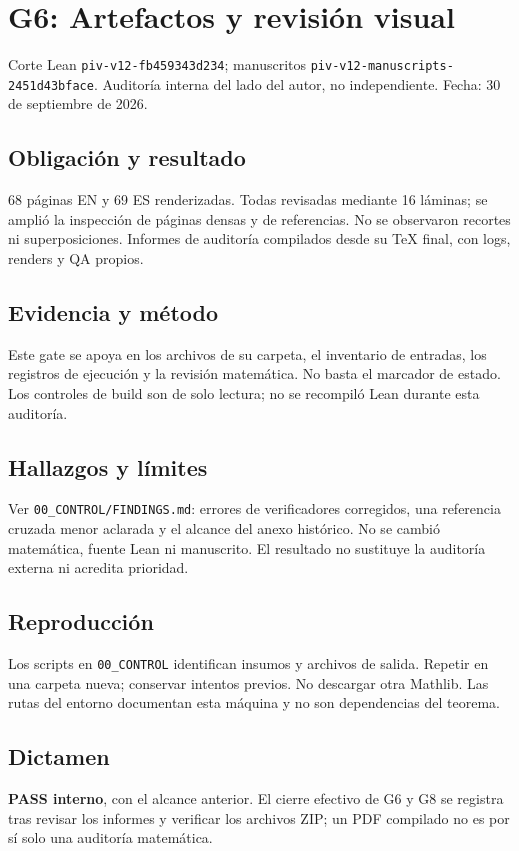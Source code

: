 \section{G6: Artefactos y revisión
visual}\label{g6-artefactos-y-revisiuxf3n-visual}

Corte Lean \texttt{piv-v12-fb459343d234}; manuscritos
\texttt{piv-v12-manuscripts-2451d43bface}. Auditoría interna del lado
del autor, no independiente. Fecha: 30 de septiembre de 2026.

\subsection{Obligación y resultado}\label{obligaciuxf3n-y-resultado}

68 páginas EN y 69 ES renderizadas. Todas revisadas mediante 16 láminas;
se amplió la inspección de páginas densas y de referencias. No se
observaron recortes ni superposiciones. Informes de auditoría compilados
desde su TeX final, con logs, renders y QA propios.

\subsection{Evidencia y método}\label{evidencia-y-muxe9todo}

Este gate se apoya en los archivos de su carpeta, el inventario de
entradas, los registros de ejecución y la revisión matemática. No basta
el marcador de estado. Los controles de build son de solo lectura; no se
recompiló Lean durante esta auditoría.

\subsection{Hallazgos y límites}\label{hallazgos-y-luxedmites}

Ver \texttt{00\_CONTROL/FINDINGS.md}: errores de verificadores
corregidos, una referencia cruzada menor aclarada y el alcance del anexo
histórico. No se cambió matemática, fuente Lean ni manuscrito. El
resultado no sustituye la auditoría externa ni acredita prioridad.

\subsection{Reproducción}\label{reproducciuxf3n}

Los scripts en \texttt{00\_CONTROL} identifican insumos y archivos de
salida. Repetir en una carpeta nueva; conservar intentos previos. No
descargar otra Mathlib. Las rutas del entorno documentan esta máquina y
no son dependencias del teorema.

\subsection{Dictamen}\label{dictamen}

\textbf{PASS interno}, con el alcance anterior. El cierre efectivo de G6
y G8 se registra tras revisar los informes y verificar los archivos ZIP;
un PDF compilado no es por sí solo una auditoría matemática.
